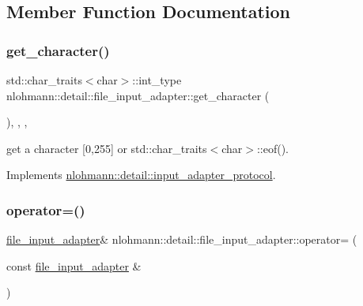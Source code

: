 \subsection{Member Function Documentation}
\mbox{\label{classnlohmann_1_1detail_1_1file__input__adapter_a0d4ff48617c8f63c30babdfd09482329}} 
\subsubsection{\texorpdfstring{get\+\_\+character()}{get\_character()}}
{\footnotesize\ttfamily std\+::char\+\_\+traits$<$char$>$\+::int\+\_\+type nlohmann\+::detail\+::file\+\_\+input\+\_\+adapter\+::get\+\_\+character (\begin{DoxyParamCaption}{ }\end{DoxyParamCaption})\hspace{0.3cm}{\ttfamily [inline]}, {\ttfamily [override]}, {\ttfamily [virtual]}, {\ttfamily [noexcept]}}



get a character \mbox{[}0,255\mbox{]} or std\+::char\+\_\+traits$<$char$>$\+::eof(). 



Implements \hyperlink{structnlohmann_1_1detail_1_1input__adapter__protocol_aac10a6a4048a8ce8e2ed50277692a3ca}{nlohmann\+::detail\+::input\+\_\+adapter\+\_\+protocol}.

\mbox{\label{classnlohmann_1_1detail_1_1file__input__adapter_ad59bbc7e3f23dd74475c5cb818784e42}} 
\subsubsection{\texorpdfstring{operator=()}{operator=()}\hspace{0.1cm}{\footnotesize\ttfamily [1/2]}}
{\footnotesize\ttfamily \hyperlink{classnlohmann_1_1detail_1_1file__input__adapter}{file\+\_\+input\+\_\+adapter}\& nlohmann\+::detail\+::file\+\_\+input\+\_\+adapter\+::operator= (\begin{DoxyParamCaption}\item[{const \hyperlink{classnlohmann_1_1detail_1_1file__input__adapter}{file\+\_\+input\+\_\+adapter} \&}]{ }\end{DoxyParamCaption})\hspace{0.3cm}{\ttfamily [delete]}}

